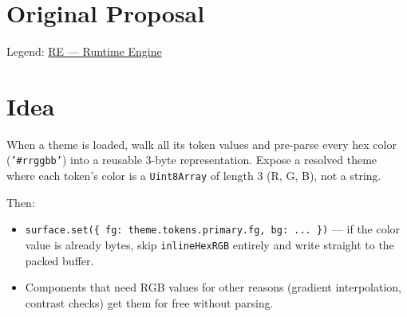 \section{Original Proposal}\label{record-369-original-proposal}

Legend: \href{https://github.com/flyingrobots/bijou/blob/1853ad902f6bf219326409e7f743a5a1d6517dbc/docs/legends/RE-runtime-engine.md}{RE --- Runtime Engine}

\section{Idea}\label{record-369-idea}

When a theme is loaded, walk all its token values and pre-parse every hex color (\texttt{'\allowbreak{}\#\allowbreak{}r\allowbreak{}r\allowbreak{}g\allowbreak{}g\allowbreak{}b\allowbreak{}b\allowbreak{}'}) into a reusable 3-byte representation. Expose a resolved theme where each token's color is a \texttt{U\allowbreak{}i\allowbreak{}n\allowbreak{}t\allowbreak{}8\allowbreak{}A\allowbreak{}r\allowbreak{}r\allowbreak{}a\allowbreak{}y} of length 3 (R, G, B), not a string.

Then:

\begin{itemize}
\tightlist
\item
  \texttt{s\allowbreak{}u\allowbreak{}r\allowbreak{}f\allowbreak{}a\allowbreak{}c\allowbreak{}e\allowbreak{}.\allowbreak{}s\allowbreak{}e\allowbreak{}t\allowbreak{}(\allowbreak{}\{\allowbreak{} \allowbreak{}f\allowbreak{}g\allowbreak{}:\allowbreak{} \allowbreak{}t\allowbreak{}h\allowbreak{}e\allowbreak{}m\allowbreak{}e\allowbreak{}.\allowbreak{}t\allowbreak{}o\allowbreak{}k\allowbreak{}e\allowbreak{}n\allowbreak{}s\allowbreak{}.\allowbreak{}p\allowbreak{}r\allowbreak{}i\allowbreak{}m\allowbreak{}a\allowbreak{}r\allowbreak{}y\allowbreak{}.\allowbreak{}f\allowbreak{}g\allowbreak{},\allowbreak{} \allowbreak{}b\allowbreak{}g\allowbreak{}:\allowbreak{} \allowbreak{}.\allowbreak{}.\allowbreak{}.\allowbreak{} \allowbreak{}\}\allowbreak{})} --- if the color value is already bytes, skip \texttt{i\allowbreak{}n\allowbreak{}l\allowbreak{}i\allowbreak{}n\allowbreak{}e\allowbreak{}H\allowbreak{}e\allowbreak{}x\allowbreak{}R\allowbreak{}G\allowbreak{}B} entirely and write straight to the packed buffer.
\item
  Components that need RGB values for other reasons (gradient interpolation, contrast checks) get them for free without parsing.
\end{itemize}


